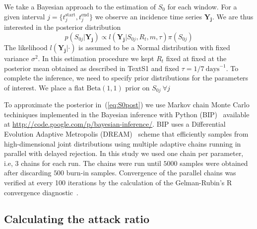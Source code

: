 We take a Bayesian approach to the estimation of $S_0$ for each window.
For a given interval $j = \{ t_j^{\text{start}}, t_j^{\text{end}} \} $ we 
observe an incidence time series $\mathbf{Y_{j}}$.
We are thus interested in the posterior distribution
\begin{equation}
 \label{eq:S0post}
 p(S_{0j}|\mathbf{Y_{j}}) \propto l(\mathbf{Y_{j}}|S_{0j}, R_t, m,  \tau 
)\pi(S_{0j}) 
\end{equation}
The likelihood $l(\mathbf{Y_{j}}|\cdot)$ is assumed to be a Normal distribution 
with fixed variance $\sigma^2$.
In this estimation procedure we kept $R_t$ fixed at fixed at the posterior mean 
obtained as described in TextS1 and fixed $\tau = 1/7\: \text{days}^{-1}$.
To complete the inference, we need to specify prior distributions for the 
parameters of interest.
We place a flat $\text{Beta}(1, 1)$ prior on $S_{0j}\:\forall j$
% 



To approximate the posterior in~(\ref{eq:S0post}) we use Markov chain Monte 
Carlo techiniques implemented in the Bayesian inference with Python 
(BIP)~\cite{pone2011} available at 
\url{http://code.google.com/p/bayesian-inference/}.
BIP uses a Differential Evolution Adaptive Metropolis (DREAM)~\cite{vrugt2008} 
scheme that efficiently samples from high-dimensional joint distributions using 
multiple adaptive chains running in parallel with delayed rejection.
In this study we used one chain per parameter, i.e, 3 chains for each run.
The chains were run until $5000$ samples were obtained after discarding $500$ 
burn-in samples.
Convergence of the parallel chains was verified at every 100 iterations by the 
calculation of the Gelman-Rubin's R convergence diagnostic~\cite{brooks1998}.

\subsection*{Calculating the attack ratio}


